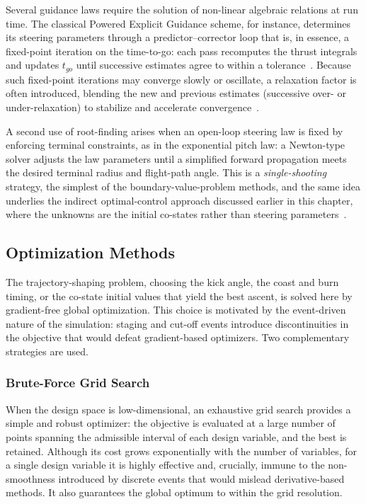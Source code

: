 Several guidance laws require the solution of non-linear algebraic relations at run time. The classical Powered Explicit Guidance scheme, for instance, determines its steering parameters through a predictor--corrector loop that is, in essence, a fixed-point iteration on the time-to-go: each pass recomputes the thrust integrals and updates $t_{go}$ until successive estimates agree to within a tolerance~\cite{burden2015numerical}. Because such fixed-point iterations may converge slowly or oscillate, a relaxation factor is often introduced, blending the new and previous estimates (successive over- or under-relaxation) to stabilize and accelerate convergence~\cite{burden2015numerical}.

A second use of root-finding arises when an open-loop steering law is fixed by enforcing terminal constraints, as in the exponential pitch law: a Newton-type solver adjusts the law parameters until a simplified forward propagation meets the desired terminal radius and flight-path angle. This is a \emph{single-shooting} strategy, the simplest of the boundary-value-problem methods, and the same idea underlies the indirect optimal-control approach discussed earlier in this chapter, where the unknowns are the initial co-states rather than steering parameters~\cite{BettsSurvey1998}.


\subsection{Optimization Methods}
\label{ssec:optimization}

The trajectory-shaping problem, choosing the kick angle, the coast and burn timing, or the co-state initial values that yield the best ascent, is solved here by gradient-free global optimization. This choice is motivated by the event-driven nature of the simulation: staging and cut-off events introduce discontinuities in the objective that would defeat gradient-based optimizers. Two complementary strategies are used.


\subsubsection{Brute-Force Grid Search}

When the design space is low-dimensional, an exhaustive grid search provides a simple and robust optimizer: the objective is evaluated at a large number of points spanning the admissible interval of each design variable, and the best is retained. Although its cost grows exponentially with the number of variables, for a single design variable it is highly effective and, crucially, immune to the non-smoothness introduced by discrete events that would mislead derivative-based methods. It also guarantees the global optimum to within the grid resolution.

